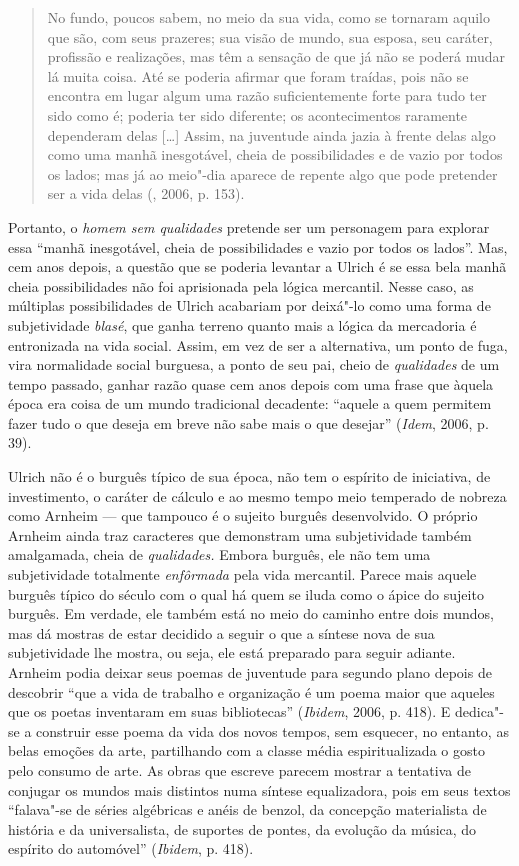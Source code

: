 \begin{quote}
No fundo, poucos sabem, no meio da sua vida, como se tornaram aquilo que
são, com seus prazeres; sua visão de mundo, sua esposa, seu caráter,
profissão e realizações, mas têm a sensação de que já não se poderá
mudar lá muita coisa. Até se poderia afirmar que foram traídas, pois não
se encontra em lugar algum uma razão suficientemente forte para tudo ter
sido como é; poderia ter sido diferente; os acontecimentos raramente
dependeram delas [\ldots{}] Assim, na juventude ainda jazia à frente
delas algo como uma manhã inesgotável, cheia de possibilidades e de
vazio por todos os lados; mas já ao meio"-dia aparece de repente algo que
pode pretender ser a vida delas (, 2006, p. 153).
\end{quote}

Portanto, o \emph{homem sem qualidades} pretende ser um personagem para
explorar essa ``manhã inesgotável, cheia de possibilidades e vazio por
todos os lados''. Mas, cem anos depois, a questão que se poderia
levantar a Ulrich é se essa bela manhã cheia possibilidades não foi
aprisionada pela lógica mercantil. Nesse caso, as múltiplas
possibilidades de Ulrich acabariam por deixá"-lo como uma forma de
subjetividade \emph{blasé}, que ganha terreno quanto mais a lógica da
mercadoria é entronizada na vida social. Assim, em vez de ser a
alternativa, um ponto de fuga, vira normalidade social burguesa, a ponto
de seu pai, cheio de \emph{qualidades} de um tempo passado, ganhar razão
quase cem anos depois com uma frase que àquela época era coisa de um
mundo tradicional decadente: ``aquele a quem permitem fazer tudo o que
deseja em breve não sabe mais o que desejar'' (\emph{Idem}, 2006, p. 39).

Ulrich não é o burguês típico de sua época, não tem o espírito de
iniciativa, de investimento, o caráter de cálculo e ao mesmo tempo meio
temperado de nobreza como Arnheim --- que tampouco é o sujeito burguês
desenvolvido. O próprio Arnheim ainda traz caracteres que demonstram uma
subjetividade também amalgamada, cheia de \emph{qualidades.} Embora
burguês, ele não tem uma subjetividade totalmente \emph{enfôrmada} pela
vida mercantil. Parece mais aquele burguês típico do século  com o
qual há quem se iluda como o ápice do sujeito burguês. Em verdade, ele
também está no meio do caminho entre dois mundos, mas dá mostras de
estar decidido a seguir o que a síntese nova de sua subjetividade lhe
mostra, ou seja, ele está preparado para seguir adiante. Arnheim podia
deixar seus poemas de juventude para segundo plano depois de descobrir
``que a vida de trabalho e organização é um poema maior que aqueles que
os poetas inventaram em suas bibliotecas'' (\emph{Ibidem}, 2006, p. 418). E
dedica"-se a construir esse poema da vida dos novos tempos, sem esquecer,
no entanto, as belas emoções da arte, partilhando com a classe média
espiritualizada o gosto pelo consumo de arte. As obras que escreve
parecem mostrar a tentativa de conjugar os mundos mais distintos numa
síntese equalizadora, pois em seus textos ``falava"-se de séries
algébricas e anéis de benzol, da concepção materialista de história e da
universalista, de suportes de pontes, da evolução da música, do espírito
do automóvel'' (\emph{Ibidem}, p. 418).

